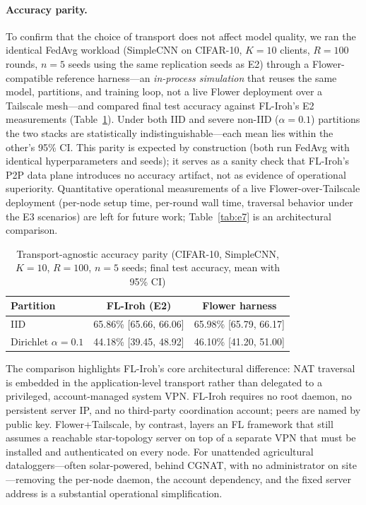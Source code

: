 ﻿\documentclass[journal]{IEEEtran}
\begin{document}
\paragraph{Accuracy parity.}
To confirm that the choice of transport does not affect model quality, we ran the identical FedAvg workload (SimpleCNN on CIFAR-10, $K{=}10$ clients, $R{=}100$ rounds, $n{=}5$ seeds using the same replication seeds as E2) through a Flower-compatible reference harness---an \emph{in-process simulation} that reuses the same model, partitions, and training loop, not a live Flower deployment over a Tailscale mesh---and compared final test accuracy against FL-Iroh's E2 measurements (Table~\ref{tab:e7acc}). Under both IID and severe non-IID ($\alpha{=}0.1$) partitions the two stacks are statistically indistinguishable---each mean lies within the other's 95\% CI. This parity is expected by construction (both run FedAvg with identical hyperparameters and seeds); it serves as a sanity check that FL-Iroh's P2P data plane introduces no accuracy artifact, not as evidence of operational superiority. Quantitative operational measurements of a live Flower-over-Tailscale deployment (per-node setup time, per-round wall time, traversal behavior under the E3 scenarios) are left for future work; Table~\ref{tab:e7} is an architectural comparison.

\begin{table}[t]
\centering
\caption{Transport-agnostic accuracy parity (CIFAR-10, SimpleCNN, $K{=}10$, $R{=}100$, $n{=}5$ seeds; final test accuracy, mean with 95\% CI)}
\label{tab:e7acc}
\footnotesize
\renewcommand{\arraystretch}{1.25}
\begin{tabular}{l c c}
\toprule
\textbf{Partition} & \textbf{FL-Iroh (E2)} & \textbf{Flower harness} \\
\midrule
IID                      & 65.86\% [65.66, 66.06] & 65.98\% [65.79, 66.17] \\
Dirichlet $\alpha{=}0.1$ & 44.18\% [39.45, 48.92] & 46.10\% [41.20, 51.00] \\
\bottomrule
\end{tabular}
\end{table}

The comparison highlights FL-Iroh's core architectural difference: NAT traversal is embedded in the application-level transport rather than delegated to a privileged, account-managed system VPN. FL-Iroh requires no root daemon, no persistent server IP, and no third-party coordination account; peers are named by public key. Flower+Tailscale, by contrast, layers an FL framework that still assumes a reachable star-topology server on top of a separate VPN that must be installed and authenticated on every node. For unattended agricultural dataloggers---often solar-powered, behind CGNAT, with no administrator on site---removing the per-node daemon, the account dependency, and the fixed server address is a substantial operational simplification.
\end{document}
